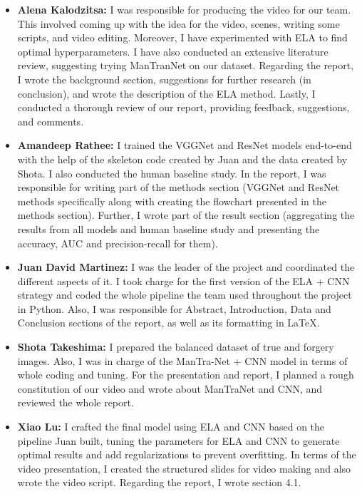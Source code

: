 \documentclass[11pt]{article}
\begin{document}
\begin{itemize}
    \item \textbf{Alena Kalodzitsa:}  I was responsible for producing the video for our team. This involved coming up with the idea for the video, scenes, writing some scripts, and video editing. Moreover, I have experimented with ELA to find optimal hyperparameters. I have also conducted an extensive literature review, suggesting trying ManTranNet on our dataset. Regarding the report, I wrote the background section, suggestions for further research (in conclusion), and wrote the description of the ELA method.  Lastly, I conducted a thorough review of our report, providing feedback, suggestions, and comments.
    \item \textbf{Amandeep Rathee:} I trained the VGGNet and ResNet models end-to-end with the help of the skeleton code created by Juan and the data created by Shota. I also conducted the human baseline study. In the report, I was responsible for writing part of the methods section (VGGNet and ResNet methods specifically along with creating the flowchart presented in the methods section). Further, I wrote part of the result section (aggregating the results from all models and human baseline study and presenting the accuracy, AUC and precision-recall for them).
    \item \textbf{Juan David Martinez:} I was the leader of the project and coordinated the different aspects of it. I took charge for the first version of the ELA + CNN strategy and coded the whole pipeline the team used throughout the project in Python. Also, I was responsible for Abstract, Introduction, Data and Conclusion sections of the report, as well as its formatting in \LaTeX.
    \item \textbf{Shota Takeshima:} I prepared the balanced dataset of true and forgery images. Also, I was in charge of the ManTra-Net + CNN model in terms of whole coding and tuning. For the presentation and report, I planned a rough constitution of our video and wrote about ManTraNet and CNN, and reviewed the whole report.
    \item \textbf{Xiao Lu:} I crafted the final model using ELA and CNN based on the pipeline Juan built, tuning the parameters for ELA and CNN to generate optimal results and add regularizations to prevent overfitting. In terms of the video presentation, I created the structured slides for video making and also wrote the video script. Regarding the report, I wrote section 4.1.
\end{itemize}
\end{document}

